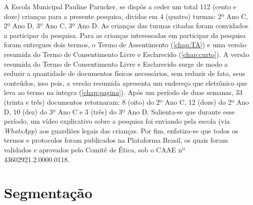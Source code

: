 A Escola Municipal Pauline Parucker, se dispôs a ceder um total 112 (cento e doze) crianças para a presente pesquisa, dividas em 4 (quatro) turmas: 2º Ano C, 2º Ano D, 3º Ano C, 3º Ano D. As crianças das turmas citadas foram convidados a participar da pesquisa. Para as crianças interessadas em participar da pesquisa foram entregues dois termos, o Termo de Assentimento (\autoref{chap:TA}) e uma versão resumida do Termo de Consentimento Livre e Esclarecido (\autoref{chap:curto}). A versão resumida do Termo de Consentimento Livre e Esclarecido surge de modo a reduzir a quantidade de documentos físicos necessários, sem reduzir de fato, seus conteúdos, isso pois, a versão resumida apresenta um endereço que eletrônico que leva ao termo na integra (\autoref{chap:pagina}). Após um período de duas semanas, 33 (trinta e três) documentos retornaram: 8 (oito) do 2º Ano C, 12 (doze) do 2º Ano D, 10 (dez) do 3º Ano C e 3 (três) do 3º Ano D. Salienta-se que durante esse período, um vídeo explicativo sobre a pesquisa foi enviando pela escola (via \textit{WhatsApp}) aos guardiões legais das crianças. Por fim, enfatiza-se que todos os termos e protocolos foram publicados na Plataforma Brasil, os quais foram validados e aprovados pelo Comitê de Ética, sob o \ac{CAAE} nº 43602921.2.0000.0118.



\section{Segmentação}\label{sec:seg}


